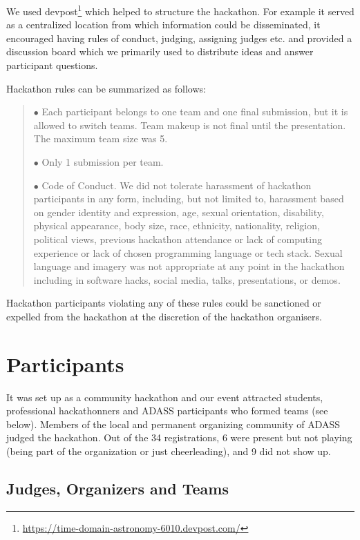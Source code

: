 \documentclass[11pt,twoside]{article}
\begin{document}
{We used devpost\footnote{\url{https://time-domain-astronomy-6010.devpost.com/}} which helped to structure the hackathon. For example it served as a centralized location from which information could be disseminated,  it encouraged having rules of conduct, judging, assigning judges etc. and provided a discussion board which we primarily used to distribute ideas and answer participant questions.

Hackathon rules can be summarized as follows:

\begin{quote}
$\bullet$ Each participant belongs to one team and one final submission, but it is allowed to switch teams. Team makeup is not final until the presentation. The maximum team size was 5.

$\bullet$ Only 1 submission per team.

$\bullet$ Code of Conduct. We did not tolerate harassment of hackathon participants in any form, including, but not limited to, harassment based on gender identity and expression, age, sexual orientation, disability, physical appearance, body size, race, ethnicity, nationality, religion, political views, previous hackathon attendance or lack of computing experience or lack of chosen programming language or tech stack. Sexual language and imagery was not appropriate at any point in the hackathon including in software hacks, social media, talks, presentations, or demos.
\end{quote}

Hackathon participants violating any of these rules could be sanctioned or expelled from the hackathon at the discretion of the hackathon organisers.

\section{Participants}

It was set up as a community hackathon and our event attracted students, professional hackathonners and ADASS participants who formed teams (see below). Members of the local and permanent organizing community of ADASS judged the hackathon.  Out of the 34 registrations, 6 were present but not playing (being part of the organization or just cheerleading), and 9 did not show up.

\subsection*{Judges, Organizers and Teams}

}
\end{document}
